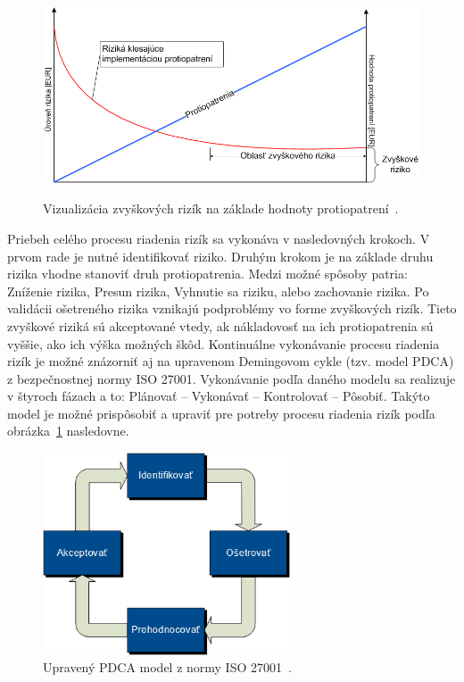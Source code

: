 \begin{figure}[H]
\begin{center}\includegraphics[width=\textwidth,height=6cm,keepaspectratio=true]{assets/zvyskove_riziko.png}\end{center}
\caption[Vizualizácia zvyškových rizík na základe hodnoty protiopatrení]{Vizualizácia zvyškových rizík na základe hodnoty protiopatrení~\cite{RiadenieRizik}.}\label{obr_3}
\end{figure}

\par Priebeh celého procesu riadenia rizík sa vykonáva v nasledovných krokoch. V prvom rade je nutné identifikovať riziko.
Druhým krokom je na základe druhu rizika vhodne stanoviť druh protiopatrenia. Medzi možné spôsoby patria: Zníženie rizika,
Presun rizika, Vyhnutie sa riziku, alebo zachovanie rizika. Po validácii ošetreného rizika vznikajú podproblémy vo forme
zvyškových rizík. Tieto zvyškové riziká sú akceptované vtedy, ak nákladovosť na ich protiopatrenia sú vyššie, ako ich výška
možných škôd. Kontinuálne vykonávanie procesu riadenia rizík je možné znázorniť aj na upravenom Demingovom cykle (tzv. model PDCA)
z bezpečnostnej normy ISO 27001. Vykonávanie podľa daného modelu sa realizuje v štyroch fázach a to: Plánovať – Vykonávať –
Kontrolovať – Pôsobiť. Takýto model je možné prispôsobiť a upraviť pre potreby procesu riadenia rizík podľa obrázka~\ref{obr_3}
nasledovne.

\begin{figure}[H]
\begin{center}\includegraphics[width=\textwidth,height=6cm,keepaspectratio=true]{assets/pdca.png}\end{center}
\caption[Upravený PDCA model z normy ISO 27001]{Upravený PDCA model z normy ISO 27001~\cite{RiadenieRizik}.}\label{obr_4}
\end{figure}

